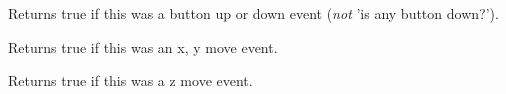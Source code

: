 \label{wxjoystickeventisbutton}


Returns true if this was a button up or down event ({\it not} 'is any button down?').

\label{wxjoystickeventismove}


Returns true if this was an x, y move event.

\label{wxjoystickeventiszmove}


Returns true if this was a z move event.

